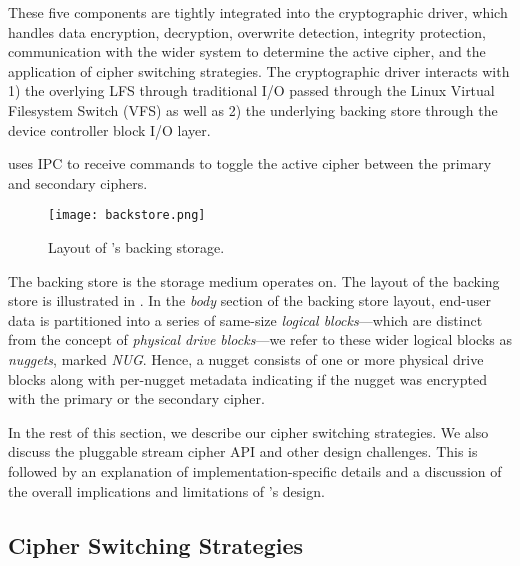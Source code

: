 These five components are tightly integrated into the cryptographic driver,
which handles data encryption, decryption, overwrite detection, integrity
protection, communication with the wider system to determine the active cipher,
and the application of cipher switching strategies. The cryptographic driver
interacts with 1) the overlying LFS through traditional I/O passed through the
Linux Virtual Filesystem Switch (VFS) as well as 2) the underlying backing store
through the device controller block I/O layer.

\SYSTEM{} uses IPC to receive commands to toggle the active cipher between the
primary and secondary ciphers. 

\begin{figure}[t]
 \centering
  \texttt{[image: backstore.png]}
   \caption{Layout of \SYSTEM{}'s backing storage.}\label{fig:backstore}
\end{figure}

The backing store is the storage medium \SYSTEM{} operates on. The layout of the
backing store is illustrated in . In the \textit{body} section
of the backing store layout, end-user data is partitioned into a series of
same-size \emph{logical blocks}---which are distinct from the concept of
\emph{physical drive blocks}---we refer to these wider logical blocks as
\emph{nuggets}, marked \textit{NUG}. Hence, a nugget consists of one or more
physical drive blocks along with per-nugget metadata indicating if the nugget
was encrypted with the primary or the secondary cipher. 

In the rest of this section, we describe our cipher switching strategies. We
also discuss the pluggable stream cipher API and other design challenges. This
is followed by an explanation of implementation-specific details and a
discussion of the overall implications and limitations of \SYSTEM{}'s design.

\subsection{Cipher Switching Strategies}

